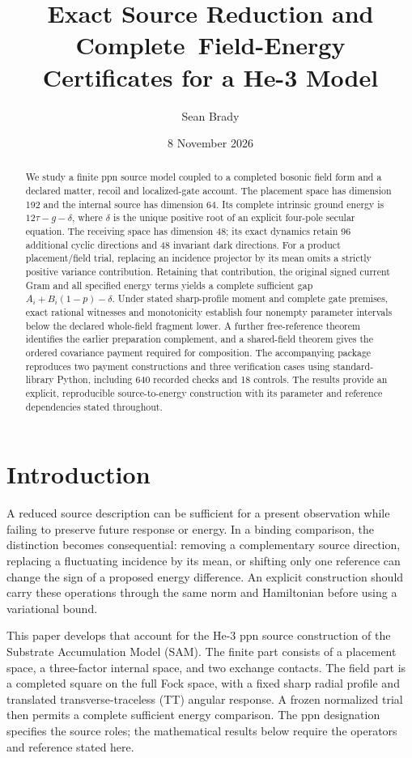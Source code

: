 \documentclass[11pt]{article}
\title{Exact Source Reduction and Complete\ Field-Energy Certificates for a He-3 Model}
\author{Sean Brady}
\date{8 November 2026}
\theoremstyle{definition}
\begin{document}
\maketitle
\begin{abstract}
We study a finite ppn source model coupled to a completed bosonic field form and a declared matter, recoil and localized-gate account. The placement space has dimension 192 and the internal source has dimension 64. Its complete intrinsic ground energy is $12\tau-g-\delta$, where $\delta$ is the unique positive root of an explicit four-pole secular equation. The receiving space has dimension 48; its exact dynamics retain 96 additional cyclic directions and 48 invariant dark directions. For a product placement/field trial, replacing an incidence projector by its mean omits a strictly positive variance contribution. Retaining that contribution, the original signed current Gram and all specified energy terms yields a complete sufficient gap $A_i+B_i(1-p)-\delta$. Under stated sharp-profile moment and complete gate premises, exact rational witnesses and monotonicity establish four nonempty parameter intervals below the declared whole-field fragment lower. A further free-reference theorem identifies the earlier preparation complement, and a shared-field theorem gives the ordered covariance payment required for composition. The accompanying package reproduces two payment constructions and three verification cases using standard-library Python, including 640 recorded checks and 18 controls. The results provide an explicit, reproducible source-to-energy construction with its parameter and reference dependencies stated throughout.
\end{abstract}

\section{Introduction}

A reduced source description can be sufficient for a present observation while failing to preserve future response or energy. In a binding comparison, the distinction becomes consequential: removing a complementary source direction, replacing a fluctuating incidence by its mean, or shifting only one reference can change the sign of a proposed energy difference. An explicit construction should carry these operations through the same norm and Hamiltonian before using a variational bound.

This paper develops that account for the He-3 ppn source construction of the Substrate Accumulation Model (SAM). The finite part consists of a placement space, a three-factor internal space, and two exchange contacts. The field part is a completed square on the full Fock space, with a fixed sharp radial profile and translated transverse-traceless (TT) angular response. A frozen normalized trial then permits a complete sufficient energy comparison. The ppn designation specifies the source roles; the mathematical results below require the operators and reference stated here.
\end{document}
